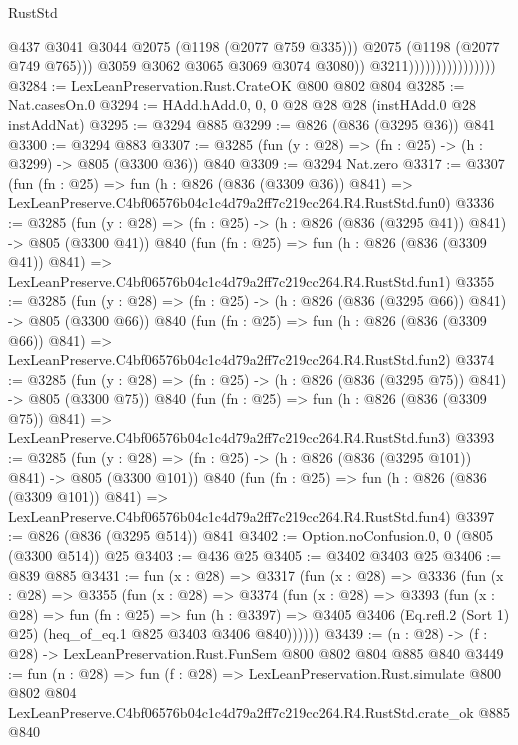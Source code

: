 \begin{lexlean}{RustStd}
\begin{coremodule}
                                            @437
                                            @3041
                                            @3044
                                            @2075
                                            (@1198 (@2077 @759 @335)))
                                          @2075
                                          (@1198 (@2077 @749 @765)))
                                        @3059
                                        @3062
                                        @3065
                                        @3069
                                        @3074
                                        @3080))
                                    @3211))))))))))))))))
@3284 := LexLeanPreservation.Rust.CrateOK @800 @802 @804
@3285 := Nat.casesOn.{0}
@3294 := HAdd.hAdd.{0, 0, 0} @28 @28 @28 (instHAdd.{0} @28 instAddNat)
@3295 := @3294 @885
@3299 := @826 (@836 (@3295 @36)) @841
@3300 := @3294 @883
@3307 := @3285 (fun (y : @28) => (fn : @25) -> (h : @3299) -> @805 (@3300 @36)) @840
@3309 := @3294 Nat.zero
@3317 := @3307
    (fun (fn : @25) =>
    fun (h : @826 (@836 (@3309 @36)) @841) =>
    LexLeanPreserve.C4bf06576b04c1c4d79a2ff7c219cc264.R4.RustStd.fun0)
@3336 := @3285
    (fun (y : @28) => (fn : @25) -> (h : @826 (@836 (@3295 @41)) @841) -> @805 (@3300 @41))
    @840
    (fun (fn : @25) =>
    fun (h : @826 (@836 (@3309 @41)) @841) =>
    LexLeanPreserve.C4bf06576b04c1c4d79a2ff7c219cc264.R4.RustStd.fun1)
@3355 := @3285
    (fun (y : @28) => (fn : @25) -> (h : @826 (@836 (@3295 @66)) @841) -> @805 (@3300 @66))
    @840
    (fun (fn : @25) =>
    fun (h : @826 (@836 (@3309 @66)) @841) =>
    LexLeanPreserve.C4bf06576b04c1c4d79a2ff7c219cc264.R4.RustStd.fun2)
@3374 := @3285
    (fun (y : @28) => (fn : @25) -> (h : @826 (@836 (@3295 @75)) @841) -> @805 (@3300 @75))
    @840
    (fun (fn : @25) =>
    fun (h : @826 (@836 (@3309 @75)) @841) =>
    LexLeanPreserve.C4bf06576b04c1c4d79a2ff7c219cc264.R4.RustStd.fun3)
@3393 := @3285
    (fun (y : @28) => (fn : @25) -> (h : @826 (@836 (@3295 @101)) @841) -> @805 (@3300 @101))
    @840
    (fun (fn : @25) =>
    fun (h : @826 (@836 (@3309 @101)) @841) =>
    LexLeanPreserve.C4bf06576b04c1c4d79a2ff7c219cc264.R4.RustStd.fun4)
@3397 := @826 (@836 (@3295 @514)) @841
@3402 := Option.noConfusion.{0, 0} (@805 (@3300 @514)) @25
@3403 := @436 @25
@3405 := @3402 @3403 @25
@3406 := @839 @885
@3431 := fun (x : @28) =>
  @3317
    (fun (x : @28) =>
    @3336
      (fun (x : @28) =>
      @3355
        (fun (x : @28) =>
        @3374
          (fun (x : @28) =>
          @3393
            (fun (x : @28) =>
            fun (fn : @25) =>
            fun (h : @3397) =>
            @3405 @3406 (Eq.refl.{2} (Sort 1) @25) (heq_of_eq.{1} @825 @3403 @3406 @840))))))
@3439 := (n : @28) -> (f : @28) -> LexLeanPreservation.Rust.FunSem @800 @802 @804 @885 @840
@3449 := fun (n : @28) =>
  fun (f : @28) =>
  LexLeanPreservation.Rust.simulate
    @800
    @802
    @804
    LexLeanPreserve.C4bf06576b04c1c4d79a2ff7c219cc264.R4.RustStd.crate_ok
    @885
    @840
\end{coremodule}
\end{lexlean}
